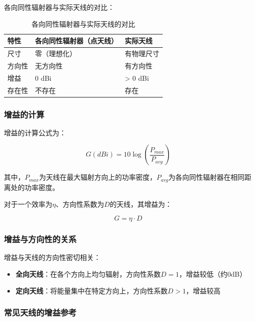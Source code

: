 各向同性辐射器与实际天线的对比：

\begin{table}[htbp]
    \centering
    \small
    \caption{各向同性辐射器与实际天线的对比}
    \begin{tabular}{|p{2cm}|p{3.5cm}|p{2cm}|}
        \hline
        \textbf{特性} & \textbf{各向同性辐射器（点天线）} & \textbf{实际天线} \\
        \hline
        尺寸 & 零（理想化） & 有物理尺寸 \\
        \hline
        方向性 & 无方向性 & 有方向性 \\
        \hline
        增益 & 0 dBi & > 0 dBi \\
        \hline
        存在性 & 不存在 & 存在 \\
        \hline
    \end{tabular}
\end{table}

\subsubsection{增益的计算}

增益的计算公式为：

\[ G(dBi) = 10\log\left(\frac{P_{max}}{P_{avg}}\right) \]

其中，$P_{max}$为天线在最大辐射方向上的功率密度，$P_{avg}$为各向同性辐射器在相同距离处的功率密度。

对于一个效率为$\eta$、方向性系数为$D$的天线，其增益为：

\[ G = \eta \cdot D \]

\subsubsection{增益与方向性的关系}

增益与天线的方向性密切相关：

\begin{itemize}
    \item \textbf{全向天线}：在各个方向上均匀辐射，方向性系数$D=1$，增益较低（约0dB）
    \item \textbf{定向天线}：将能量集中在特定方向上，方向性系数$D>1$，增益较高
\end{itemize}

\subsubsection{常见天线的增益参考}

